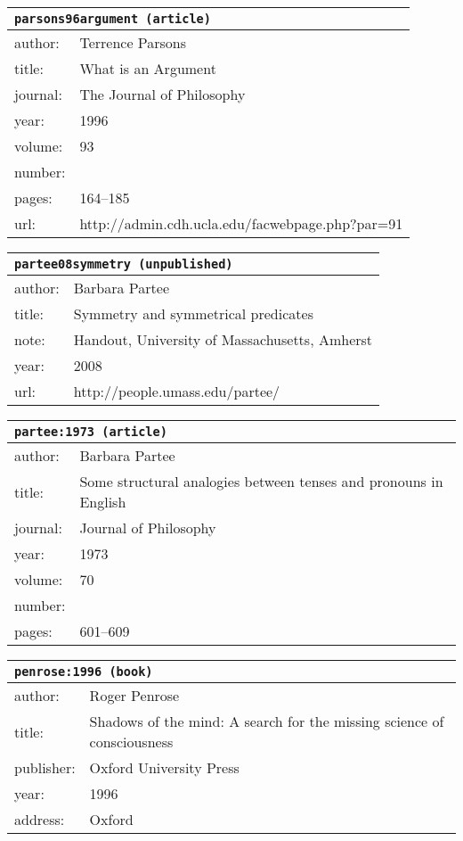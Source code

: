 \documentclass{article}
\begin{document}
\bigskip

\begin{tabular}{p{}p{}}
\multicolumn{2}{l}{\texttt{parsons96argument (article)}}\\
\hline
author: & Terrence Parsons\\
title: & What is an Argument\\
journal: & The Journal of Philosophy\\
year: & 1996\\
volume: & 93\\
number: & \\
pages: & 164--185\\
url: & http://admin.cdh.ucla.edu/facwebpage.php?par=91\\
\end{tabular}

\bigskip

\begin{tabular}{p{}p{}}
\multicolumn{2}{l}{\texttt{partee08symmetry (unpublished)}}\\
\hline
author: & Barbara Partee\\
title: & Symmetry and symmetrical predicates\\
note: & \textsc{H}andout, University of Massachusetts, Amherst\\
year: & 2008\\
url: & http://people.umass.edu/partee/\\
\end{tabular}

\bigskip

\begin{tabular}{p{}p{}}
\multicolumn{2}{l}{\texttt{partee:1973 (article)}}\\
\hline
author: & Barbara Partee\\
title: & Some structural analogies between tenses and pronouns in English\\
journal: & Journal of Philosophy\\
year: & 1973\\
volume: & 70\\
number: & \\
pages: & 601--609\\
\end{tabular}

\bigskip

\begin{tabular}{p{}p{}}
\multicolumn{2}{l}{\texttt{penrose:1996 (book)}}\\
\hline
author: & Roger Penrose\\
title: & Shadows of the mind: A search for the missing science of consciousness\\
publisher: & Oxford University Press\\
year: & 1996\\
address: & Oxford\\
\end{tabular}
\end{document}
